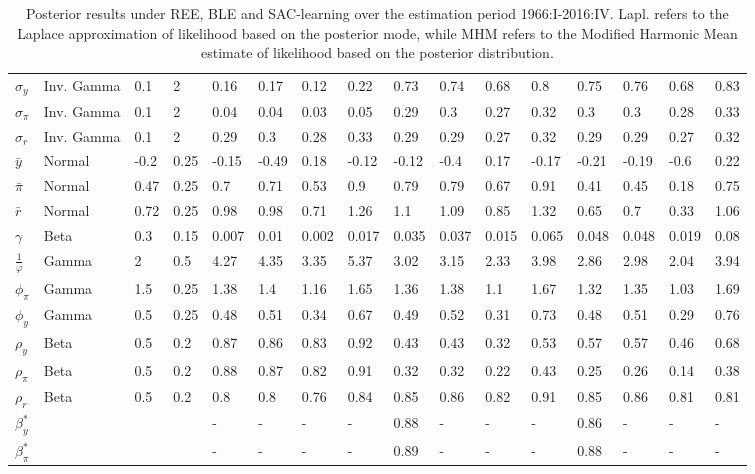 \begin{table}
\begin{tabular}{l|lll|llll||llll||llll}
\hline
\hline
 $\sigma_y$  & Inv. Gamma &0.1&2& 	0.16     & 0.17    & 0.12 & 0.22  		&	0.73 & 0.74    & 0.68 & 0.8                   &    0.75 & 0.76 & 0.68 & 0.83   \\
 $\sigma_{\pi}$ & Inv. Gamma &0.1&2&	0.04     & 0.04    & 0.03 & 0.05 		& 	 0.29 & 0.3     & 0.27 & 0.32                 &  0.3 & 0.3 & 0.28 & 0.33 \\
 $\sigma_r$  & Inv. Gamma &0.1&2&		0.29     & 0.3     & 0.28 & 0.33 		&	 0.29 & 0.29     & 0.27 & 0.32                &   0.29 & 0.29 & 0.27 & 0.32    \\
 $\bar{y}$  &Normal&-0.2&0.25&		-0.15    & -0.49    & 0.18  			&	 -0.12 & -0.12    & -0.4    & 0.17&   -0.17   & -0.21 	& -0.19 & -0.6 & 0.22\\
 $\bar{\pi}$ &Normal&0.47&0.25&		0.7     & 0.71    & 0.53 & 0.9 			&	 0.79 & 0.79    & 0.67 & 0.91              	  &    0.41 & 0.45 & 0.18 & 0.75        \\
 $\bar{r}$  &Normal&0.72&0.25&		0.98     & 0.98    & 0.71 & 1.26  		& 	 1.1 & 1.09    & 0.85 & 1.32                  &    0.65 & 0.7 & 0.33 & 1.06      \\
 $\gamma$  &Beta&0.3&0.15&			0.007     & 0.01    & 0.002  & 0.017    &	 0.035 & 0.037    & 0.015 & 0.065             &  0.048 & 0.048 & 0.019 & 0.08 \\
 $\frac{1}{\varphi}$  &Gamma&2 & 0.5&	4.27     & 4.35   & 3.35 & 5.37 		& 	 3.02 & 3.15    & 2.33 & 3.98       		  &   2.86 & 2.98 & 2.04 & 3.94   \\
 $\phi_{\pi}$ &Gamma&1.5&0.25&		1.38     & 1.4   & 1.16 & 1.65   		& 	 1.36 & 1.38   & 1.1 & 1.67  				  &   1.32 & 1.35 & 1.03 & 1.69     \\
 $\phi_y$  &Gamma&0.5&0.25&			0.48     & 0.51    & 0.34 & 0.67 		&	 0.49 & 0.52    & 0.31 & 0.73                 &     0.48 & 0.51 & 0.29 & 0.76  \\
 $\rho_y$  &Beta&0.5&0.2&			0.87     & 0.86    & 0.83 & 0.92 		& 	 0.43 & 0.43    & 0.32 & 0.53                 &     0.57 & 0.57 & 0.46 & 0.68 \\
 $\rho_{\pi}$ &Beta&0.5&0.2&		0.88     & 0.87    & 0.82 & 0.91  		&	 0.32 & 0.32    & 0.22 & 0.43                 &    0.25 & 0.26 & 0.14 & 0.38           \\
 $\rho_r$     &Beta&0.5&0.2& 		0.8     & 0.8     & 0.76 & 0.84 		& 	0.85 & 0.86    & 0.82 & 0.91                  &    0.85 & 0.86 & 0.81 & 0.81    \\
 $\beta_y^{*}$ & & & & 		-     &  -    & - & 	-	& 	0.88 &  -  & - &     -              &    0.86 & - & - &   -   \\
 $\beta_{\pi}^{*}$ & & & & 		-    &   -   & - & 	-	& 	0.89 &  -  & - &    -               &    0.88 & - & - & -     \\
\end{tabular}

\caption{\small Posterior results under REE, BLE and SAC-learning over the estimation period 1966:I-2016:IV. Lapl. refers to the Laplace approximation of likelihood based on the posterior mode, while MHM refers to the Modified Harmonic Mean estimate of likelihood based on the posterior distribution. }
\label{table2}
\end{table}
